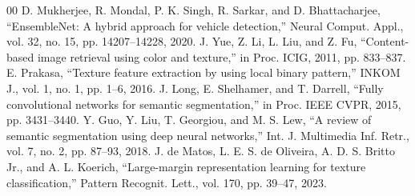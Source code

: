 \documentclass[conference]{IEEEtran}
\begin{document}
\begin{thebibliography}{00}
 D. Mukherjee, R. Mondal, P. K. Singh, R. Sarkar, and D. Bhattacharjee, ``EnsembleNet: A hybrid approach for vehicle detection,'' Neural Comput. Appl., vol. 32, no. 15, pp. 14207--14228, 2020.
 J. Yue, Z. Li, L. Liu, and Z. Fu, ``Content-based image retrieval using color and texture,'' in Proc. ICIG, 2011, pp. 833--837.
 E. Prakasa, ``Texture feature extraction by using local binary pattern,'' INKOM J., vol. 1, no. 1, pp. 1--6, 2016.
 J. Long, E. Shelhamer, and T. Darrell, ``Fully convolutional networks for semantic segmentation,'' in Proc. IEEE CVPR, 2015, pp. 3431--3440.
 Y. Guo, Y. Liu, T. Georgiou, and M. S. Lew, ``A review of semantic segmentation using deep neural networks,'' Int. J. Multimedia Inf. Retr., vol. 7, no. 2, pp. 87--93, 2018.
 J. de Matos, L. E. S. de Oliveira, A. D. S. Britto Jr., and A. L. Koerich, ``Large-margin representation learning for texture classification,'' Pattern Recognit. Lett., vol. 170, pp. 39--47, 2023.
\end{thebibliography}
\end{document}
